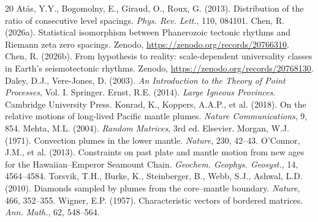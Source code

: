 \documentclass[12pt,a4paper]{article}
\begin{document}
\begin{thebibliography}{20}
 At\'as, Y.Y., Bogomolny, E., Giraud, O., Roux, G. (2013). Distribution of the ratio of consecutive level spacings. \textit{Phys. Rev. Lett.}, 110, 084101.
 Chen, R. (2026a). Statistical isomorphism between Phanerozoic tectonic rhythms and Riemann zeta zero spacings. Zenodo, \url{https://zenodo.org/records/20766310}.
 Chen, R. (2026b). From hypothesis to reality: scale-dependent universality classes in Earth's seismotectonic rhythms. Zenodo, \url{https://zenodo.org/records/20768130}.
 Daley, D.J., Vere-Jones, D. (2003). \textit{An Introduction to the Theory of Point Processes}, Vol. I. Springer.
 Ernst, R.E. (2014). \textit{Large Igneous Provinces}. Cambridge University Press.
 Konrad, K., Koppers, A.A.P., et al. (2018). On the relative motions of long-lived Pacific mantle plumes. \textit{Nature Communications}, 9, 854.
 Mehta, M.L. (2004). \textit{Random Matrices}, 3rd ed. Elsevier.
 Morgan, W.J. (1971). Convection plumes in the lower mantle. \textit{Nature}, 230, 42--43.
 O'Connor, J.M., et al. (2013). Constraints on past plate and mantle motion from new ages for the Hawaiian--Emperor Seamount Chain. \textit{Geochem. Geophys. Geosyst.}, 14, 4564--4584.
 Torsvik, T.H., Burke, K., Steinberger, B., Webb, S.J., Ashwal, L.D. (2010). Diamonds sampled by plumes from the core--mantle boundary. \textit{Nature}, 466, 352--355.
 Wigner, E.P. (1957). Characteristic vectors of bordered matrices. \textit{Ann. Math.}, 62, 548--564.
\end{thebibliography}
\end{document}
